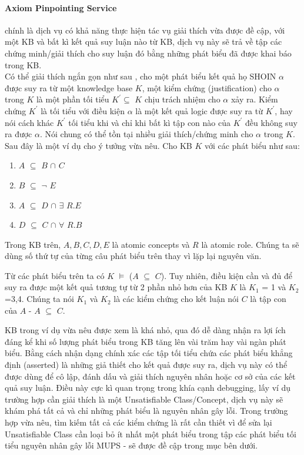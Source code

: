 \paragraph{Axiom Pinpointing Service} chính là dịch vụ có khả năng thực hiện tác vụ giải thích vừa được đề cập, với một KB và bất kì kết quả suy luận nào từ KB, dịch vụ này sẽ trả về tập các chứng minh/giải thích cho suy luận đó bằng những phát biểu đã được khai báo trong KB.
\\
\hspace*{0.05\textwidth} Có thể giải thích ngắn gọn như sau \cite[p.~2]{axiomPinpoint}, cho một phát biểu kết quả họ SHOIN $\alpha$ được suy ra từ một knowledge base $K$, một kiểm chứng (justification) cho $\alpha$  trong $K$ là một phần tối tiểu $K^{'}\subseteq$ $K$ chịu trách nhiệm cho $\alpha$ xảy ra. Kiểm chứng $K^{'}$ là tối tiểu với điều kiện $\alpha$ là một kết quả logic được suy ra từ $K^{'}$, hay nói cách khác $K^{'}$ tối tiểu khi và chỉ khi bất kì tập con nào của $K^{'}$ đều không suy ra được $\alpha$. Nói chung có thể tồn tại nhiều giải thích/chứng minh cho $\alpha$ trong $K$. Sau đây là một ví dụ cho ý tưởng vừa nêu. Cho KB $K$ với các phát biểu như sau:
\begin{enumerate}
	\item	$A$ $\subseteq$ $B$ $\cap$ $C$ 
	\item	$B$ $\subseteq$ $\neg$ $E$
	\item	$A$ $\subseteq$ $D$ $\cap$ $\exists$ $R.E$ 
	\item	$D$ $\subseteq$ $C$ $\cap$ $\forall$ $R.B$
\end{enumerate}
		
Trong KB trên, $A, B, C, D, E$ là atomic concepts và $R$ là atomic role.  Chúng ta sẽ dùng số thứ tự của từng câu phát biểu trên thay vì lặp lại nguyên văn.
 
\hspace*{0.05\textwidth} Từ các phát biểu trên ta có $K$ $\models$ ($A$ $\subseteq$ $C$). Tuy nhiên, điều kiện cần và đủ để suy ra được một kết quả tương tự từ 2 phần nhỏ hơn của KB $K$ là $K_{1}$ = {1} và $K_{2}$ ={3,4}. Chúng ta nói $K_{1}$ và $K_{2}$ là các kiểm chứng cho kết luận nói $C$ là tập con của $A$ - $A$ $\subseteq$ $C$.

\hspace*{0.05\textwidth} KB trong ví dụ vừa nêu được xem là khá nhỏ, qua đó dễ dàng nhận ra lợi ích đáng kể khi số lượng phát biểu trong KB tăng lên vài trăm hay vài ngàn phát biểu. Bằng cách nhận dạng chính xác các tập tối tiểu chứa các phát biểu khẳng định (asserted) là những giả thiết cho kết quả được suy ra, dịch vụ này có thể được dùng để cô lập, đánh dấu và giải thích nguyên nhân hoặc cơ sở của các kết quả suy luận. Điều này cực kì quan trọng trong khía cạnh debugging, lấy ví dụ trường hợp cần giải thích là một Unsatisfiable Class/Concept, dịch vụ này sẽ khám phá tất cả và chỉ những phát biểu là nguyên nhân gây lỗi. Trong trường hợp vừa nêu, tìm kiếm tất cả các kiểm chứng là rất cần thiết vì để sửa lại Unsatisfiable Class cần loại bỏ ít nhất một phát biểu trong tập các phát biểu tối tiểu nguyên nhân gây lỗi MUPS - sẽ được đề cập trong mục bên dưới.

